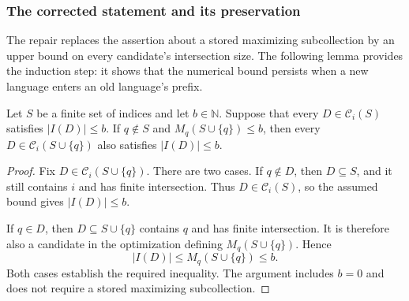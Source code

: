 \subsubsection{The corrected statement and its preservation}

The repair replaces the assertion about a stored maximizing
subcollection by an upper bound on every candidate's intersection
size. The following lemma provides the induction step: it shows
that the numerical bound persists when a new language enters an
old language's prefix.

\begin{supplem}
\label{lem:pareto-score-invariant}
Let $S$ be a finite set of indices and let $b\in\mathbb N$.
Suppose that every $D\in\mathcal C_i(S)$ satisfies $|I(D)|\le b$.
If $q\notin S$ and $M_q(S\cup\{q\})\le b$, then every
$D\in\mathcal C_i(S\cup\{q\})$ also satisfies $|I(D)|\le b$.
\end{supplem}
\begin{proof}
Fix $D\in\mathcal C_i(S\cup\{q\})$. There are two cases.
If $q\notin D$, then $D\subseteq S$, and it still contains $i$
and has finite intersection. Thus $D\in\mathcal C_i(S)$, so the
assumed bound gives $|I(D)|\le b$.

If $q\in D$, then $D\subseteq S\cup\{q\}$ contains $q$ and has
finite intersection. It is therefore also a candidate in the
optimization defining $M_q(S\cup\{q\})$. Hence
\[
 |I(D)|\le M_q(S\cup\{q\})\le b.
\]
Both cases establish the required inequality. The argument includes
$b=0$ and does not require a stored maximizing subcollection.
\end{proof}

